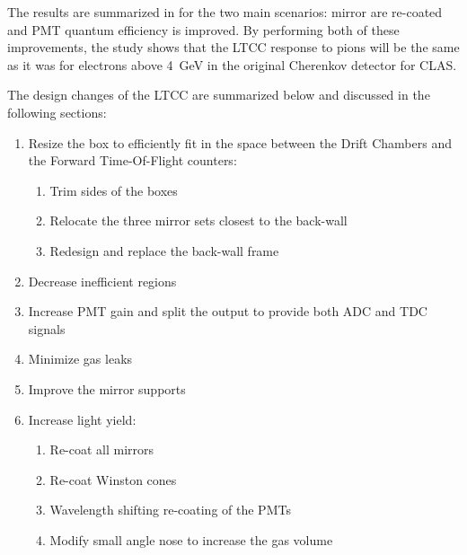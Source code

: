 The results are summarized in  for the two main scenarios: mirror are re-coated and PMT quantum
efficiency is improved. By performing both of these improvements, the study shows that the LTCC response to pions
will be the same as it was for electrons above 4~GeV in the original Cherenkov detector for CLAS.

The design changes of the LTCC are summarized below and discussed in the following sections:

\begin{enumerate}
    \item Resize the box to efficiently fit in the space between the Drift Chambers and the Forward Time-Of-Flight counters:
	\begin{enumerate}
		\item Trim sides of the boxes
		\item Relocate the three mirror sets closest to the back-wall
		\item Redesign and replace the back-wall frame
	\end{enumerate}

	\item Decrease inefficient regions
	\item Increase PMT gain and split the output to provide both ADC and TDC signals
	\item Minimize gas leaks
	\item Improve the mirror supports
	\item Increase light yield:
	\begin{enumerate}
		\item Re-coat all mirrors
		\item Re-coat Winston cones
		\item Wavelength shifting re-coating of the PMTs
		\item Modify small angle nose to increase the gas volume
	\end{enumerate}
\end{enumerate}








